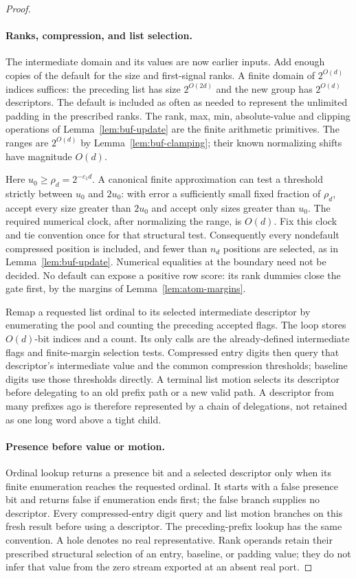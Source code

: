 \begin{proof}
\begingroup
{}
\paragraph{Ranks, compression, and list selection.}
The intermediate domain and its values are now earlier inputs.  Add
enough copies of the default for the size and first-signal ranks.  A
finite domain of $2^{O(d)}$ indices suffices: the preceding list has
size $2^{O(2d)}$ and the new group has $2^{O(d)}$ descriptors.  The
default is included as often as needed to represent the unlimited
padding in the prescribed ranks.  The rank, max, min, absolute-value
and clipping operations of Lemma~\ref{lem:buf-update} are the finite
arithmetic primitives.  The ranges are $2^{O(d)}$ by
Lemma~\ref{lem:buf-clamping}; their known normalizing shifts have
magnitude $O(d)$.
\par\endgroup

Here $u_0\ge\rho_d=2^{-c_1d}$.  A canonical finite approximation can
test a threshold strictly between $u_0$ and $2u_0$: with error a
sufficiently small fixed fraction of $\rho_d$, accept every size
greater than $2u_0$ and accept only sizes greater than $u_0$.
The required numerical clock, after normalizing the range, is $O(d)$.
Fix this clock and tie convention once for that structural test.
Consequently every nondefault compressed position is included, and
fewer than $n_d$ positions are selected, as in
Lemma~\ref{lem:buf-update}.  Numerical equalities at the boundary need
not be decided.  No default can expose a positive row score: its
rank dummies close the gate first, by the margins of
Lemma~\ref{lem:atom-margins}.

Remap a requested list ordinal to its selected intermediate descriptor
by enumerating the pool and counting the preceding accepted flags.
The loop stores $O(d)$-bit indices and a count.  Its only calls are the
already-defined intermediate flags and finite-margin selection tests.
Compressed entry digits then query that descriptor's intermediate value
and the common compression thresholds; baseline digits use those
thresholds directly.  A terminal list motion selects its descriptor
before delegating to an old prefix path or a new valid path.  A
descriptor from many prefixes ago is therefore represented by a chain
of delegations, not retained as one long word above a tight child.

\paragraph{Presence before value or motion.}
Ordinal lookup returns a presence bit and a selected descriptor only
when its finite enumeration reaches the requested ordinal. It starts
with a false presence bit and returns false if enumeration ends first;
the false branch supplies no descriptor. Every compressed-entry digit
query and list motion branches on this fresh result before using a
descriptor. The preceding-prefix lookup has the same convention.
A hole denotes no real representative. Rank operands retain their
prescribed structural selection of an entry, baseline, or padding
value; they do not infer that value from the zero stream exported
at an absent real port.


\end{proof}
